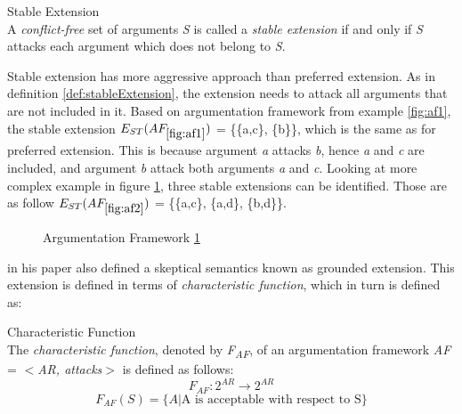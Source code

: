 \begin{definition}{Stable Extension}
\label{def:stableExtension}\\
A \textit{conflict-free} set of arguments \textit{S} is called a \textit{stable extension} if and only if \textit{S} attacks each argument which does not belong to \textit{S}.
\end{definition}

Stable extension has more aggressive approach than preferred extension. As in definition \ref{def:stableExtension}, the extension needs to attack all arguments that are not included in it. Based on argumentation framework from example \ref{fig:af1}, the stable extension \textit{$E_{ST}(AF_{\ref{fig:af1}})$} = \{\{a,c\}, \{b\}\}, which is the same as for preferred extension. This is because argument \textit{a} attacks \textit{b}, hence \textit{a} and \textit{c} are included, and argument \textit{b} attack both arguments \textit{a} and \textit{c}. Looking at more complex example in figure \ref{fig:af2}, three stable extensions can be identified. Those are as follow \textit{$E_{ST}(AF_{\ref{fig:af2}})$} = \{\{a,c\}, \{a,d\}, \{b,d\}\}.

\begin{figure}[h]
\centering
{}
\caption{Argumentation Framework \ref{fig:af2}}
\label{fig:af2}
\end{figure}

\citet{dung1995} in his paper also defined a skeptical semantics known as grounded extension. This extension is defined in terms of \textit{characteristic function}, which in turn is defined as:

\begin{definition}{Characteristic Function}
\label{def:characteristicFunction}\\
The \textit{characteristic function}, denoted by \textit{F\textsubscript{AF}}, of an argumentation framework \textit{AF} = $<$\textit{AR, attacks}$>$ is defined as follows:
\[F_{AF}:2^{AR} \rightarrow 2^{AR}\]
\[F_{AF}(S)=\{A| \text{A is acceptable with respect to S} \}\]
\end{definition}

